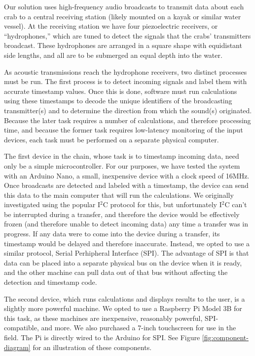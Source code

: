 \documentclass[12pt]{article}
\begin{document}
Our solution uses high-frequency audio broadcasts to transmit data about
each crab to a central receiving station (likely mounted on a kayak or similar
water vessel).
At the receiving station we have four piezoelectric receivers, or
``hydrophones,'' which are tuned to detect the signals that the crabs'
transmitters broadcast.
These hydrophones are arranged in a square shape with equidistant side
lengths, and all are to be submerged an equal depth into the water.

As acoustic transmissions reach the hydrophone receivers, two distinct
processes must be run.
The first process is to detect incoming signals and label them with accurate
timestamp values.
Once this is done, software must run calculations using these timestamps
to decode the unique identifiers of the broadcasting transmitter(s) and to
determine the direction from which the sound(s) originated.
Because the later task requires a number of calculations, and therefore
processing time,
and because the former task requires low-latency monitoring of the input
devices, each task must be performed on a separate physical computer.

The first device in the chain, whose task is to timestamp incoming data,
need only be a simple microcontroller.
For our purposes, we have tested the system with an Arduino Nano, a small,
inexpensive device with a clock speed of 16MHz.
Once broadcasts are detected and labeled with a timestamp, the device can
send this data to the main computer that will run the calculations.
We originally investigated using the popular I$^2$C protocol for this, but
unfortunately I$^2$C can't be interrupted during a transfer, and therefore
the device would be effectively frozen (and therefore unable to detect
incoming data) any time a transfer was in progress.
If any data were to come into the device during a transfer, its timestamp
would be delayed and therefore inaccurate.
Instead, we opted to use a similar protocol, Serial Perhipheral Interface
(SPI).
The advantage of SPI is that data can be placed into a separate physical
bus on the device when it is ready, and the other machine can pull data out
of that bus without affecting the detection and timestamp code.

The second device, which runs calculations and displays results to the user,
is a slightly more powerful machine.
We opted to use a Raspberry Pi Model 3B for this task, as these machines are
inexpensive, reasonably powerful, SPI-compatible, and more.
We also purchased a 7-inch touchscreen for use in the field.
The Pi is directly wired to the Arduino for SPI.
See Figure \ref{fig:component-diagram} for an illustration of these components.
\end{document}

